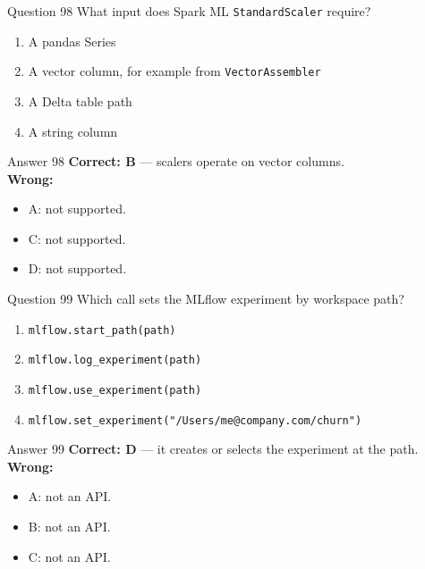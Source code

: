 \documentclass[aspectratio=169,11pt]{beamer}
\begin{document}
\begin{frame}{Question 98}
What input does Spark ML \texttt{StandardScaler} require?
\begin{enumerate}[label=\Alph*.]
\item A pandas Series
\item A vector column, for example from \texttt{VectorAssembler}
\item A Delta table path
\item A string column
\end{enumerate}
\end{frame}
\begin{frame}{Answer 98}
\textbf{Correct: B} --- scalers operate on vector columns.\\
\vspace{0.5em}
\textbf{Wrong:}
\begin{itemize}
\item A: not supported.
\item C: not supported.
\item D: not supported.
\end{itemize}
\end{frame}

\begin{frame}{Question 99}
Which call sets the MLflow experiment by workspace path?
\begin{enumerate}[label=\Alph*.]
\item \texttt{mlflow.start\_path(path)}
\item \texttt{mlflow.log\_experiment(path)}
\item \texttt{mlflow.use\_experiment(path)}
\item \texttt{mlflow.set\_experiment("/Users/me@company.com/churn")}
\end{enumerate}
\end{frame}
\begin{frame}{Answer 99}
\textbf{Correct: D} --- it creates or selects the experiment at the path.\\
\vspace{0.5em}
\textbf{Wrong:}
\begin{itemize}
\item A: not an API.
\item B: not an API.
\item C: not an API.
\end{itemize}
\end{frame}
\end{document}
